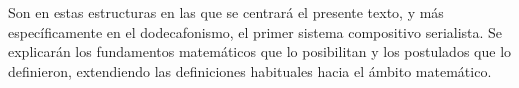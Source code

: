 		Son en estas estructuras en las que se centrará el presente texto, y más específicamente en el dodecafonismo, el primer sistema compositivo serialista. Se explicarán los fundamentos matemáticos que lo posibilitan y los postulados que lo definieron, extendiendo las definiciones habituales hacia el ámbito matemático. %
        
        
        
        
    
    \renewcommand*\contentsname{\vspace{-2\bigskipamount}\begin{LARGE}\textbf{Índice}\end{LARGE}}
	\begin{changemargin}{-0.5cm}{-0.5cm}
		\tableofcontents
	\end{changemargin}
	\newpage$\ $
	\thispagestyle{empty}
	\newpage
	
	\pagestyle{plain}
